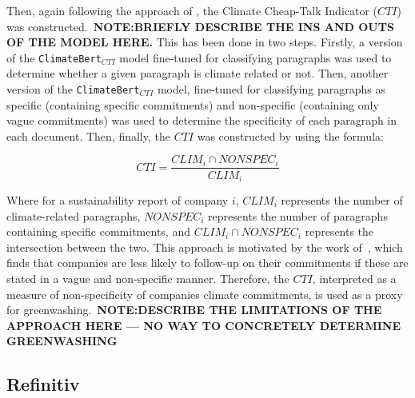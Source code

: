 \documentclass[12pt]{article}
\begin{document}
Then, again following the approach of \citeauthor{bingler_how_2024}, the Climate Cheap-Talk Indicator ($CTI$) was constructed.\ \textbf{NOTE:\@ BRIEFLY DESCRIBE THE INS AND OUTS OF THE MODEL HERE.} This has been done in two steps. Firstly, a version of the \texttt{ClimateBert}$_{CTI}$ model fine-tuned for classifying paragraphs was used to determine whether a given paragraph is climate related or not. Then, another version of the \texttt{ClimateBert}$_{CTI}$ model, fine-tuned for classifying paragraphs as specific (containing specific commitments) and non-specific (containing only vague commitments) was used to determine the specificity of each paragraph in each document. Then, finally, the $CTI$ was constructed by using the formula:


\begin{equation}
    CTI = \frac{CLIM_i \cap NONSPEC_i}{CLIM_{i}}
\end{equation}

Where for a sustainability report of company $i$, $CLIM_i$ represents the number of climate-related paragraphs, $NONSPEC_i$ represents the number of paragraphs containing specific commitments, and $CLIM_i \cap NONSPEC_i$ represents the intersection between the two. 
This approach is motivated by the work of\ \cite{coen_are_2022}, which finds that companies are less likely to follow-up on their commitments if these are stated in a vague and non-specific manner. Therefore, the $CTI$, interpreted as a measure of non-specificity of companies climate commitments, is used as a proxy for greenwashing.\ \textbf{NOTE:\@ DESCRIBE THE LIMITATIONS OF THE APPROACH HERE --- NO WAY TO CONCRETELY DETERMINE GREENWASHING}




\subsection{Refinitiv}
\end{document}
